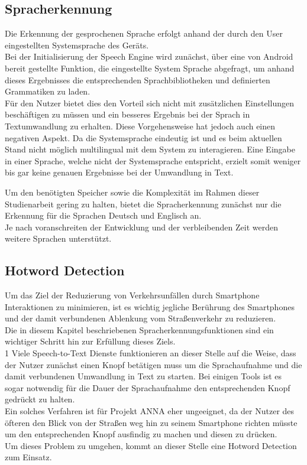 \subsection{Spracherkennung}
Die Erkennung der gesprochenen Sprache erfolgt anhand der durch den User eingestellten Systemsprache des Geräts.\\
Bei der Initialisierung der Speech Engine wird zunächst, über eine von Android bereit gestellte Funktion, die eingestellte System Sprache abgefragt, um anhand dieses Ergebnisses die entsprechenden Sprachbibliotheken und definierten Grammatiken zu laden.\\
Für den Nutzer bietet dies den Vorteil sich nicht mit zusätzlichen Einstellungen beschäftigen zu müssen und ein besseres Ergebnis bei der Sprach in Textumwandlung zu erhalten. Diese Vorgehensweise hat jedoch auch einen negativen Aspekt. Da die Systemsprache eindeutig ist und es beim aktuellen Stand nicht möglich multilingual mit dem System zu interagieren. Eine Eingabe in einer Sprache, welche nicht der Systemsprache entspricht, erzielt somit weniger bis gar keine genauen Ergebnisse bei der Umwandlung in Text.

Um den benötigten Speicher sowie die Komplexität im Rahmen dieser Studienarbeit gering zu halten, bietet die Spracherkennung zunächst nur die Erkennung für die Sprachen Deutsch und Englisch an.\\
Je nach voranschreiten der Entwicklung und der verbleibenden Zeit werden weitere Sprachen unterstützt.

\subsection{Hotword Detection}
\label{scthotword}
Um das Ziel der Reduzierung von Verkehrsunfällen durch Smartphone Interaktionen zu minimieren, ist es wichtig jegliche Berührung des Smartphones und der damit verbundenen Ablenkung vom Straßenverkehr zu reduzieren.\\
Die in diesem Kapitel beschriebenen Spracherkennungsfunktionen sind ein wichtiger Schritt hin zur Erfüllung dieses Ziels.\\1
Viele Speech-to-Text Dienste funktionieren an dieser Stelle auf die Weise, dass der Nutzer zunächst einen Knopf betätigen muss um die Sprachaufnahme und die damit verbundenen Umwandlung in Text zu starten. Bei einigen Tools ist es sogar notwendig für die Dauer der Sprachaufnahme den entsprechenden Knopf gedrückt zu halten.\\
Ein solches Verfahren ist für Projekt \ac{ANNA} eher ungeeignet, da der Nutzer des öfteren den Blick von der Straßen weg hin zu seinem Smartphone richten müsste um den entsprechenden Knopf ausfindig zu machen und diesen zu drücken.\\
Um dieses Problem zu umgehen, kommt an dieser Stelle eine Hotword Detection zum Einsatz.

